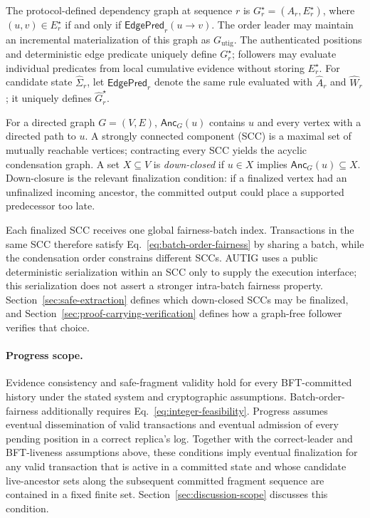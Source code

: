 The protocol-defined dependency graph at sequence $r$ is
$G_r^\star=(A_r,E_r^\star)$, where
$(u,v)\in E_r^\star$ if and only if
$\mathsf{EdgePred}_r(u\to v)$.  The order leader may maintain an incremental
materialization of this graph as $G_{\mathrm{utig}}$.  The authenticated
positions and deterministic edge predicate uniquely define $G_r^\star$;
followers may evaluate individual predicates from local cumulative evidence
without storing $E_r^\star$.
For candidate state $\widehat\Sigma_r$, let
$\widehat{\mathsf{EdgePred}}_r$ denote the same rule evaluated with
$\widehat A_r$ and $\widehat W_r$; it uniquely defines
$\widehat G_r^\star$.

For a directed graph $G=(V,E)$, $\mathsf{Anc}_G(u)$ contains $u$ and every
vertex with a directed path to $u$.  A strongly connected component (SCC) is a
maximal set of mutually reachable vertices; contracting every SCC yields the
acyclic condensation graph.  A set $X\subseteq V$ is \emph{down-closed} if
$u\in X$ implies $\mathsf{Anc}_G(u)\subseteq X$.  Down-closure is the relevant
finalization condition: if a finalized vertex had an unfinalized incoming
ancestor, the committed output could place a supported predecessor too late.

Each finalized SCC receives one global fairness-batch index.  Transactions in
the same SCC therefore satisfy Eq.~\eqref{eq:batch-order-fairness} by sharing a
batch, while the condensation order constrains different SCCs.  AUTIG uses a
public deterministic serialization within an SCC only to supply the execution
interface; this serialization does not assert a stronger intra-batch fairness
property.  Section~\ref{sec:safe-extraction} defines which down-closed SCCs may
be finalized, and Section~\ref{sec:proof-carrying-verification} defines how a
graph-free follower verifies that choice.

\paragraph{Progress scope.}
Evidence consistency and safe-fragment validity hold for every BFT-committed
history under the stated system and cryptographic assumptions.
Batch-order-fairness additionally requires
Eq.~\eqref{eq:integer-feasibility}.  Progress assumes eventual dissemination
of valid transactions and eventual admission of every pending position in a
correct replica's log.  Together with the correct-leader and BFT-liveness
assumptions above, these conditions imply eventual finalization for any valid
transaction that is active in a committed state and whose candidate
live-ancestor sets along the subsequent committed fragment sequence are
contained in a fixed finite set.  Section~\ref{sec:discussion-scope} discusses
this condition.

